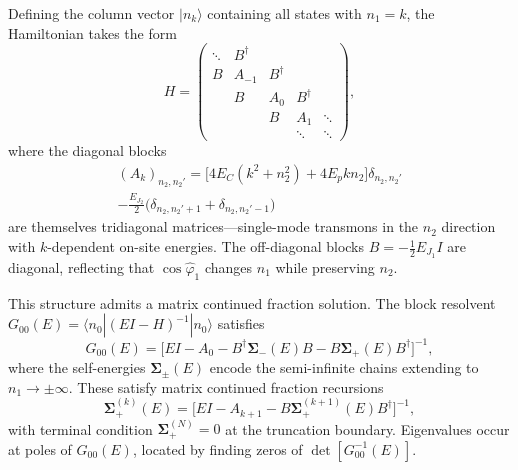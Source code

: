 \documentclass[reprint, floatfix, superscriptaddress, amsmath, amssymb, longbibliography]{revtex4-2}
\begin{document}
Defining the column vector $|{n}_k\rangle$ containing all states with $n_1 = k$, the Hamiltonian takes the form
\begin{equation}
{H} = \begin{pmatrix}
\ddots & {B}^\dagger & & \\
{B} & {A}_{-1} & {B}^\dagger & \\
& {B} & {A}_0 & {B}^\dagger & \\
& & {B} & {A}_1 & \ddots \\
& & & \ddots & \ddots
\end{pmatrix},
\label{eq:H_block}
\end{equation}
where the diagonal blocks
\begin{multline}
({A}_k)_{n_2, n_2'}
= \bigl[4E_C(k^2 + n_2^2) + 4E_p k n_2\bigr]\delta_{n_2, n_2'} \\
- \frac{E_{J_2}}{2}
\bigl(\delta_{n_2, n_2'+1} + \delta_{n_2, n_2'-1}\bigr)
\end{multline}
are themselves tridiagonal matrices---single-mode transmons in the $n_2$ direction with $k$-dependent on-site energies. The off-diagonal blocks ${B} = -\tfrac{1}{2}E_{J_1}{I}$ are diagonal, reflecting that $\cos\hat{\varphi}_1$ changes $n_1$ while preserving $n_2$.


This structure admits a matrix continued fraction solution. The block resolvent ${G}_{00}(E) = \langle {n}_0 | (E{I} - {H})^{-1} | {n}_0 \rangle$ satisfies
\begin{equation}
{G}_{00}(E) = \bigl[ E{I} - {A}_0 - {B}^\dagger \boldsymbol{\Sigma}_{-}(E) {B} - {B} \boldsymbol{\Sigma}_{+}(E) {B}^\dagger \bigr]^{-1},
\label{eq:G00_matrix}
\end{equation}
where the self-energies $\boldsymbol{\Sigma}_{\pm}(E)$ encode the semi-infinite chains extending to $n_1 \to \pm\infty$. These satisfy matrix continued fraction recursions
\begin{equation}
\boldsymbol{\Sigma}_{+}^{(k)}(E) = \bigl[ E{I} - {A}_{k+1} - {B} \boldsymbol{\Sigma}_{+}^{(k+1)}(E) {B}^\dagger \bigr]^{-1},
\label{eq:Sigma_recursion}
\end{equation}
with terminal condition $\boldsymbol{\Sigma}_{+}^{(N)} = {0}$ at the truncation boundary. Eigenvalues occur at poles of ${G}_{00}(E)$, located by finding zeros of $\det[{G}_{00}^{-1}(E)]$.
\end{document}
